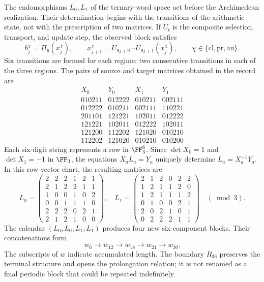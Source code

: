 The endomorphisms \(L_0,L_1\) of the ternary-word space act before the Archimedean realization. Their determination begins with the transitions of the arithmetic state, not with the prescription of two matrices. If \(U_t\) is the composite selection, transport, and update step, the observed block satisfies
\[
 b_j^\chi=\Pi_6(x_j^\chi),\qquad
 x_{j+1}^\chi=U_{9j+9}\cdots U_{9j+1}(x_j^\chi),
 \qquad \chi\in\{\mathrm{cl},\mathrm{pr},\mathrm{au}\}.
\]
Six transitions are formed for each regime: two consecutive transitions in each of the three regions. The pairs of source and target matrices obtained in the record are
\[
\begin{array}{c|c|c|c}
X_0&Y_0&X_1&Y_1\\\hline
010211&012222&010211&002111\\
012222&010211&002111&110221\\
201101&121221&102011&012222\\
121221&102011&012222&102011\\
121200&112202&121020&010210\\
112202&121020&010210&010200
\end{array}
\]
Each six-digit string represents a row in \(\FF_3^6\). Since \(\det X_0=1\) and \(\det X_1=-1\) in \(\FF_3\), the equations \(X_aL_a=Y_a\) uniquely determine \(L_a=X_a^{-1}Y_a\). In this row-vector chart, the resulting matrices are
\[
 L_0=\begin{pmatrix}
 2&2&2&1&2&1\\2&1&2&2&1&1\\1&0&0&1&0&2\\
 0&0&1&1&1&0\\2&2&2&0&2&1\\2&1&2&1&0&0
 \end{pmatrix},\quad
 L_1=\begin{pmatrix}
 2&1&2&0&2&2\\1&2&1&1&2&0\\1&2&1&1&1&2\\
 0&1&0&0&2&1\\2&0&2&1&0&1\\0&2&2&2&1&1
 \end{pmatrix}\quad(\bmod3).
\]
The calendar \((L_0,L_0,L_1,L_1)\) produces four new six-component blocks. Their concatenations form
\[
 w_6\longrightarrow w_{12}\longrightarrow w_{18}
 \longrightarrow w_{24}\longrightarrow w_{30}.
\]
The subscripts of \(w\) indicate accumulated length. The boundary \(R_{36}\) preserves the terminal structure and opens the prolongation relation; it is not renamed as a final periodic block that could be repeated indefinitely.

